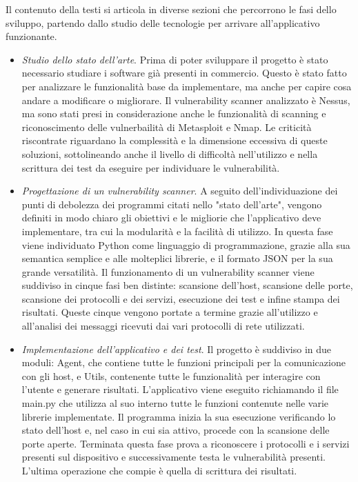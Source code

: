 \documentclass{article}
\begin{document}
Il contenuto della testi si articola in diverse sezioni che percorrono le fasi dello sviluppo, partendo dallo studio delle tecnologie per arrivare all'applicativo funzionante.
\begin{itemize}
    \item \textit{Studio dello stato dell'arte}. Prima di poter sviluppare il progetto è stato necessario studiare i software già presenti in commercio. Questo è stato fatto per analizzare le funzionalità base da implementare, ma anche per capire cosa andare a modificare o migliorare. Il vulnerability scanner analizzato è Nessus, ma sono stati presi in considerazione anche le funzionalità di scanning e riconoscimento delle vulnerbailità di Metasploit e Nmap. Le criticità riscontrate riguardano la complessità e la dimensione eccessiva di queste soluzioni, sottolineando anche il livello di difficoltà nell'utilizzo e nella scrittura dei test da eseguire per individuare le vulnerabilità.
    \item \textit{Progettazione di un vulnerability scanner}. A seguito dell'individuazione dei punti di debolezza dei programmi citati nello "stato dell'arte", vengono definiti in modo chiaro gli obiettivi e le migliorie che l'applicativo deve implementare, tra cui la modularità e la facilità di utilizzo. In questa fase viene individuato Python come linguaggio di programmazione, grazie alla sua semantica semplice e alle molteplici librerie, e il formato JSON per la sua grande versatilità. Il funzionamento di un vulnerability scanner viene suddiviso in cinque fasi ben distinte: scansione dell'host, scansione delle porte, scansione dei protocolli e dei servizi, esecuzione dei test e infine stampa dei risultati. Queste cinque vengono portate a termine grazie all'utilizzo e all'analisi dei messaggi ricevuti dai vari protocolli di rete utilizzati. 
    \item \textit{Implementazione dell'applicativo e dei test}. Il progetto è suddiviso in due moduli: Agent, che contiene tutte le funzioni principali per la comunicazione con gli host, e Utils, contenente tutte le funzionalità per interagire con l'utente e generare risultati. L'applicativo viene eseguito richiamando il file main.py che utilizza al suo interno tutte le funzioni contenute nelle varie librerie implementate. Il programma inizia la sua esecuzione verificando lo stato dell'host e, nel caso in cui sia attivo, procede con la scansione delle porte aperte. Terminata questa fase prova a riconoscere i protocolli e i servizi presenti sul dispositivo e successivamente testa le vulnerabilità presenti. L'ultima operazione che compie è quella di scrittura dei risultati.\\

\end{itemize}
\end{document}
